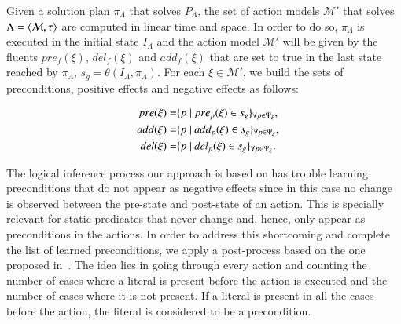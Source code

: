 Given a solution plan $\pi_\Lambda$ that solves $P_{\Lambda}$, the set of action models $\mathcal{M}'$ that solves $\Lambda={\langle \mathcal{M},\tau \rangle}$ are computed in linear time and space. In order to do so, $\pi_\Lambda$ is executed in the initial state $I_{\Lambda}$ and the action model $\mathcal{M}'$ will be given by the fluents $pre_f(\xi)$, $del_f(\xi)$ and $add_f(\xi)$ that are set to true in the last state reached by $\pi_\Lambda$, $s_g=\theta(I_\Lambda,\pi_\Lambda)$. For each $\xi \in \mathcal{M'}$, we build the sets of preconditions, positive effects and negative effects as follows:


\begin{small}
	\begin{align*}
	\hspace*{7pt}pre(\xi)=& \{p ~|~ pre_p(\xi) \in s_g\}_{\forall p \in \Psi_\xi},\\
	\hspace*{7pt}add(\xi)=& \{p ~|~ add_p(\xi) \in s_g\}_{\forall p \in \Psi_\xi},\\
	\hspace*{7pt}del(\xi)=& \{p ~|~ del_p(\xi) \in s_g\}_{\forall p \in \Psi_\xi}.
	\end{align*}
\end{small}

The logical inference process our approach is based on has trouble learning preconditions that do not appear as negative effects since in this case no change is observed between the pre-state and post-state of an action. This is specially relevant for static predicates that never change and, hence, only appear as preconditions in the actions. In order to address this shortcoming \textcolor[rgb]{1.00,0.00,0.00}{and complete the list of learned preconditions}, we apply a post-process based on the one proposed in~\cite{kuvcera2018louga}. \textcolor[rgb]{1.00,0.00,0.00}{The idea lies in going through every action and counting the number of cases where a literal is present before the action is executed and the number of cases where it is not present. If a literal is present in all the cases before the action, the literal is considered to be a precondition.}

